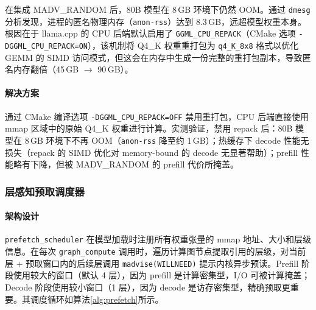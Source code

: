 在集成 MADV\_RANDOM 后，80B 模型在 8\,GB 环境下仍然 OOM。通过 \texttt{dmesg} 分析发现，进程的匿名物理内存（\texttt{anon-rss}）达到 8.3\,GB，远超模型权重本身。根因在于 llama.cpp 的 CPU 后端默认启用了 \texttt{GGML\_CPU\_REPACK}（CMake 选项 \texttt{-DGGML\_CPU\_REPACK=ON}），该机制将 Q4\_K 权重重打包为 \texttt{q4\_K\_8x8} 格式以优化 GEMM 的 SIMD 访问模式，但这会在内存中生成一份完整的重打包副本，导致匿名内存翻倍（45\,GB $\to$ 90\,GB）。

\paragraph{解决方案}

通过 CMake 编译选项 \texttt{-DGGML\_CPU\_REPACK=OFF} 禁用重打包，CPU 后端直接使用 mmap 区域中的原始 Q4\_K 权重进行计算。实测验证，禁用 repack 后：80B 模型在 8\,GB 环境下不再 OOM（\texttt{anon-rss} 降至约 1\,GB）；热缓存下 decode 性能无损失（repack 的 SIMD 优化对 memory-bound 的 decode 无显著帮助）；prefill 性能略有下降，但被 MADV\_RANDOM 的 prefill 代价所掩盖。

\subsubsection{层感知预取调度器}

\paragraph{架构设计}

\texttt{prefetch\_scheduler} 在模型加载时注册所有权重张量的 mmap 地址、大小和层级信息。在每次 \texttt{graph\_compute} 调用时，遍历计算图节点提取引用的层级，对当前层 + 预取窗口内的后续层调用 \texttt{madvise(WILLNEED)} 提示内核异步预读。Prefill 阶段使用较大的窗口（默认 4 层），因为 prefill 是计算密集型，I/O 可被计算掩盖；Decode 阶段使用较小窗口（1 层），因为 decode 是访存密集型，精确预取更重要。其调度循环如算法\ref{alg:prefetch}所示。

